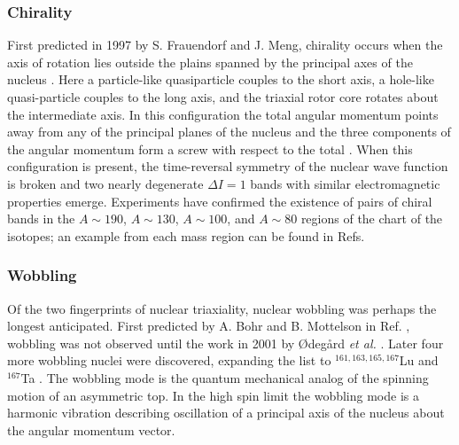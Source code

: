 \subsubsection{Chirality}
\label{sssec:intro-rot-chiral}
First predicted in 1997  by S. Frauendorf and J. Meng, chirality occurs when the axis of rotation lies outside the plains spanned by the principal axes of the nucleus \cite{frauendorfChirality,chiralityOfNuclearRotation,frauendorfTAC}. Here a particle-like quasiparticle couples to the short axis, a hole-like quasi-particle couples to the long axis, and the triaxial rotor core rotates about the intermediate axis. In this configuration the total angular momentum points away from any of the principal planes of the nucleus and the three components of the angular momentum form a screw with respect to the total \cite{frauendorfChirality}.  When this configuration is present, the time-reversal symmetry of the nuclear wave function is broken and two nearly degenerate $\Delta{}I=1$ bands with similar electromagnetic properties emerge. Experiments have confirmed the existence of pairs of chiral bands in the $A\sim{}190$, $A\sim{}130$, $A\sim{}100$, and  $A\sim{}80$ regions of the chart of the isotopes; an example from each mass region can be found in Refs. \cite{chiralityMore135Nd,chiralityIn104Rh,chiralityIn188Ir,chiralityIn80Br}

\subsubsection{Wobbling}
\label{sssec:intro-rot-wob}
Of the two fingerprints of nuclear triaxiality, nuclear wobbling was perhaps the longest anticipated. First predicted by A. Bohr and B. Mottelson in Ref. \cite{bohrMottelson2}, wobbling was not observed until the work in 2001 by \O{}deg\aa{}rd \emph{et al.} \cite{wobblingIn163Lu}. Later four more wobbling nuclei were discovered, expanding the list to $^{161,163,165,167}$Lu and $^{167}$Ta \cite{wobblingIn163Lu,wobblingIn163LuTwoPhonon,wobblingIn165Lu,wobblingIn167Lu,wobblingIn161Lu,wobblingIn167Ta}. The wobbling mode is the quantum mechanical analog of the spinning motion of an asymmetric top. In the high spin limit the wobbling mode is a harmonic vibration describing oscillation of a principal axis of the nucleus about the angular momentum vector.

